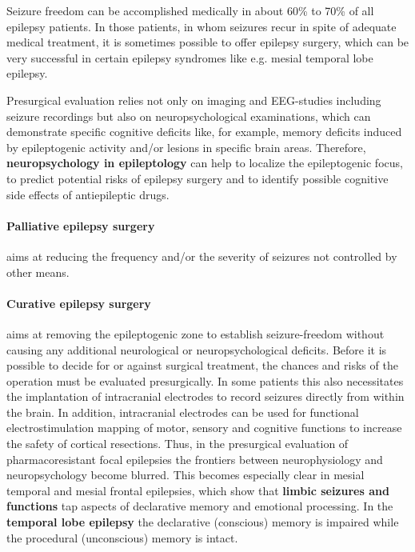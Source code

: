 \documentclass[12pt,article,oneside,a4paper]{memoir}
\begin{document}
Seizure freedom can be accomplished medically in about 60\% to 70\% of all epilepsy patients. In those patients, in whom seizures recur in spite of adequate medical treatment, it is sometimes possible to offer epilepsy surgery, which can be very successful in certain epilepsy syndromes like e.g. mesial temporal lobe epilepsy.

Presurgical evaluation relies not only on imaging and EEG-studies including seizure recordings but also on neuropsychological examinations, which can demonstrate specific cognitive deficits like, for example, memory deficits induced by epileptogenic activity and/or lesions in specific brain areas. Therefore, \textbf{neuropsychology in epileptology} can help to localize the epileptogenic focus, to predict potential risks of epilepsy surgery and to identify possible cognitive side effects of antiepileptic drugs.

\paragraph{Palliative epilepsy surgery} aims at reducing the frequency and/or the severity of seizures not controlled by other means.

\paragraph{Curative epilepsy surgery} aims at removing the epileptogenic zone to establish seizure-freedom without causing any additional neurological or neuropsychological deficits.
Before it is possible to decide for or against surgical treatment, the chances and risks of the operation must be evaluated presurgically. In some patients this also necessitates the implantation of intracranial electrodes to record seizures directly from within the brain. In addition, intracranial electrodes can be used for functional electrostimulation mapping of motor, sensory and cognitive functions to increase the safety of cortical resections.
Thus, in the presurgical evaluation of pharmacoresistant focal epilepsies the frontiers between neurophysiology and neuropsychology become blurred. This becomes especially clear in mesial temporal and mesial frontal epilepsies, which show that \textbf{limbic seizures and functions} tap aspects of declarative memory and emotional processing.
In the \textbf{temporal lobe epilepsy} the declarative (conscious) memory is impaired while the procedural (unconscious) memory is intact.

\newpage
\end{document}

